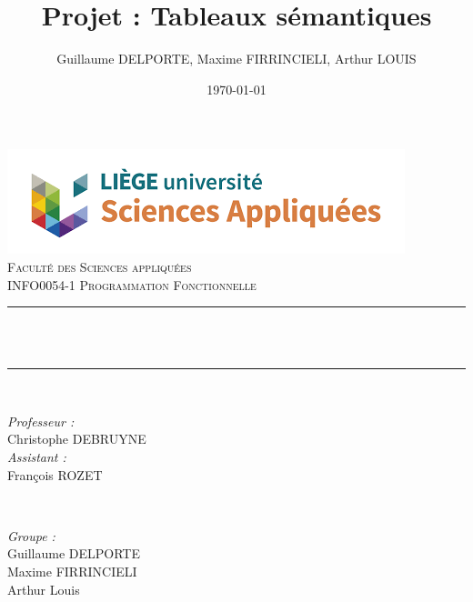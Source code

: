 \documentclass{article}
\begin{document}

 \title{Projet : Tableaux sémantiques}								%
 \author{Guillaume DELPORTE, Maxime FIRRINCIELI, Arthur LOUIS}								%
 \date{\today}											%

 \makeatletter
 \let\thetitle\@title
 \let\theauthor\@author
 \let\thedate\@date
 \makeatother

 \pagestyle{fancy}
 \fancyhf{}
 \rhead{\theauthor}
 \lhead{\thetitle}
 \cfoot{\thepage}

 \begin{titlepage}
 	\centering
     \vspace*{0.5 cm}
     \includegraphics[scale = 0.7]{facsa.png}\\[1.0 cm]	%
     \textsc{\LARGE \newline\newline Faculté des Sciences appliquées}\\[2.0 cm]	%
 	\textsc{\Large INFO0054-1 Programmation Fonctionnelle}\\[0.5 cm]				%
 	\rule{\linewidth}{0.2 mm} \\[0.4 cm]
 	{ \huge \bfseries \thetitle}\\
 	\rule{\linewidth}{0.2 mm} \\[1.5 cm]

 	\begin{minipage}{0.5\textwidth}
 		\begin{flushleft} \large
 			\emph{Professeur :}\\
 			Christophe DEBRUYNE\\
             \vspace{0.5cm}
             \emph{Assistant :}\\
             François ROZET\\
 			\end{flushleft}
 			\end{minipage}~
 			\begin{minipage}{0.4\textwidth}

 			\begin{flushright} \large
 			\emph{Groupe :} \\
 			Guillaume DELPORTE\\
             Maxime FIRRINCIELI\\
             Arthur Louis\\
 		\end{flushright}

 	\end{minipage}\\[2 cm]


     \thedate
 \end{titlepage}
\end{document}
